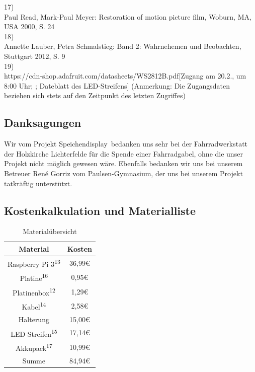 \documentclass [a4paper, 11pt] {article}
\begin{document}
17)\\
Paul Read, Mark-Paul Meyer: \glqq Restoration of motion picture film\grqq, Woburn, MA, USA 2000, S. 24\\
18)\\
Annette Lauber, Petra Schmalstieg: \glqq Band 2: Wahrnehemen und Beobachten\grqq, Stuttgart 2012, S. 9\\
19) \\
https://cdn-shop.adafruit.com/datasheets/WS2812B.pdf[Zugang am 20.2., um 8:00 Uhr; ; Dateblatt des LED-Streifens]
(Anmerkung: Die Zugangsdaten beziehen sich stets auf den Zeitpunkt des letzten Zugriffes)

\subsection{Danksagungen}
Wir vom Projekt \glqq Speichendisplay\grqq\ bedanken uns sehr bei der Fahrradwerkstatt der Holzkirche Lichterfelde für die Spende einer Fahrradgabel, ohne die unser Projekt nicht möglich gewesen wäre. Ebenfalls bedanken wir uns bei unserem Betreuer René Gorriz vom Paulsen-Gymnasium, der uns bei unserem Projekt tatkräftig unterstützt.
\subsection{Kostenkalkulation und Materialliste}
\begin{table}[H]
	\caption{Materialübersicht}
	\centering
		\begin{tabular}{|c|c|}
			\hline
			 Material & Kosten\\  
			\hline
			Raspberry Pi 3\textsuperscript{13} & 36,99\euro \\
			Platine\textsuperscript{16} & 0,95\euro \\
			Platinenbox\textsuperscript{12} & 1,29\euro \\
			Kabel\textsuperscript{14} & 2,58\euro \\
			Halterung & 15,00\euro \\
			LED-Streifen\textsuperscript{15} & 17,14\euro \\
			Akkupack\textsuperscript{17}	& 10,99\euro \\
			\hline
			Summe & 84,94\euro\\
			\hline
		\end{tabular}
	\label{Material}
\end{table}
\end{document}
